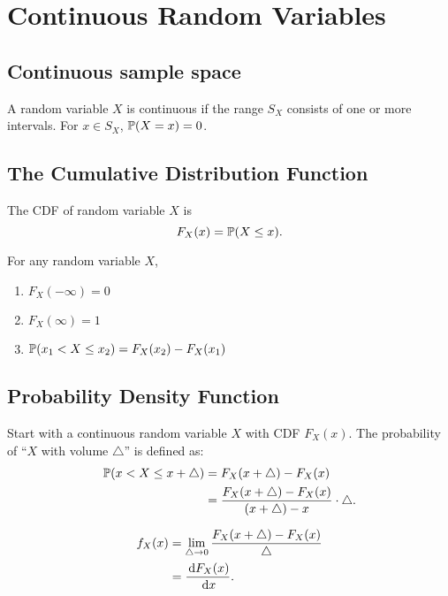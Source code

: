 \chapter{Continuous Random Variables}


\section{Continuous sample space} 
\begin{axiom}
    A random variable $X$ is continuous if the range $S_X$ consists of one or more intervals. For $x\in S_X$, $\P{X=x}=0$. 
\end{axiom}


\section{The Cumulative Distribution Function}
\begin{definition}
    The CDF of random variable $X$ is 
    \[F_X(x) = \P{X\leq x}.\]
\end{definition}

\begin{theorem}
    For any random variable $X$,
    \begin{enumerate}
        \item $F_X(-\infty)=0$
        \item $F_X(\infty)=1$
        \item $\P{x_1<X\leq x_2} = F_X(x_2)-F_X(x_1)$
    \end{enumerate}
\end{theorem}


\section{Probability Density Function}
Start with a continuous random variable $X$ with CDF $F_X(x)$. The probability of ``$X$ with volume $\triangle$'' is defined as:
\begin{align*}
    \P{x<X\leq x+\triangle} 
    &= F_X(x+\triangle)-F_X(x) \\
    &= \frac{F_X(x+\triangle)-F_X(x)}{(x+\triangle)-x}\cdot\triangle.
\end{align*}
\begin{definition} 
    \begin{align*}
        f_X(x) 
        &= \lim_{\triangle\rightarrow 0}\frac{F_X(x+\triangle)-F_X(x)}{\triangle} \\
        &= \frac{\,\mathrm{d} F_X(x)}{\,\mathrm{d} x}.
    \end{align*}
\end{definition}

